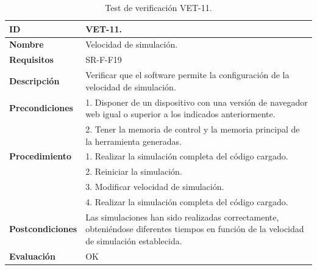 \begin{center}
\begin{table}[htb]
\centering
\begin{tabular}{@{}p{2.5cm} p{13cm}@{}} 
\toprule
\textbf{ID} 					& VET-11. \\
\midrule
\textbf{Nombre} 				& Velocidad de simulación. \\
\midrule
\textbf{Requisitos} 		& SR-F-F19\\
\midrule
\textbf{Descripción} 		& Verificar que el software permite la configuración de la velocidad de simulación. \\
\midrule
\textbf{Precondiciones}		& 1. Disponer de un dispositivo con una versión de navegador web igual o superior a los indicados anteriormente. \\
											& 2. Tener la memoria de control y la memoria principal de la herramienta generadas. \\
\midrule
\textbf{Procedimiento}		& 1. Realizar la simulación completa del código cargado.\\
											& 2. Reiniciar la simulación.\\
											& 3. Modificar velocidad de simulación. \\
											& 4. Realizar la simulación completa del código cargado.\\
\midrule
\textbf{Postcondiciones} 		&  Las simulaciones han sido realizadas correctamente, obteniéndose diferentes tiempos en función de la velocidad de simulación establecida.\\
\midrule
\textbf{Evaluación} 			& OK \\
\bottomrule
\end{tabular}
\caption{Test de verificación VET-11.}
\label{tab:vet11}
\end{table}
\end{center}

